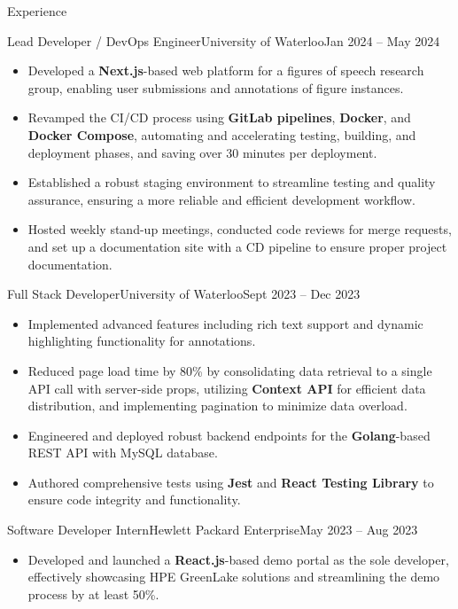 \documentclass[]{mcdowellcv}
\begin{document}
	\begin{cvsection}{Experience}
		\begin{cvsubsection}{Lead Developer / DevOps Engineer}{University of Waterloo}{Jan 2024 -- May 2024}	
			\begin{itemize}
				\item Developed a \textbf{Next.js}-based web platform for a figures of speech research group, enabling user submissions and annotations of figure instances.
				\item Revamped the CI/CD process using \textbf{GitLab pipelines}, \textbf{Docker}, and \textbf{Docker Compose}, automating and accelerating testing, building, and deployment phases, and saving over 30 minutes per deployment.
				\item Established a robust staging environment to streamline testing and quality assurance, ensuring a more reliable and efficient development workflow.
				\item Hosted weekly stand-up meetings, conducted code reviews for merge requests, and set up a documentation site with a CD pipeline to ensure proper project documentation.
			\end{itemize}	
		\end{cvsubsection}
		\begin{cvsubsection}{Full Stack Developer}{University of Waterloo}{Sept 2023 -- Dec 2023}
			\begin{itemize}
				\item Implemented advanced features including rich text support and dynamic highlighting functionality for annotations.
				\item Reduced page load time by 80\% by consolidating data retrieval to a single API call with server-side props, utilizing \textbf{Context API} for efficient data distribution, and implementing pagination to minimize data overload.
				\item Engineered and deployed robust backend endpoints for the \textbf{Golang}-based REST API with MySQL database.
				\item Authored comprehensive tests using \textbf{Jest} and \textbf{React Testing Library} to ensure code integrity and functionality.
			\end{itemize}
		\end{cvsubsection}
		\begin{cvsubsection}{Software Developer Intern}{Hewlett Packard Enterprise}{May 2023 -- Aug 2023}	
			\begin{itemize}
				\item Developed and launched a \textbf{React.js}-based demo portal as the sole developer, effectively showcasing HPE GreenLake solutions and streamlining the demo process by at least 50\%.

\end{itemize}
\end{cvsubsection}
\end{cvsection}
\end{document}
